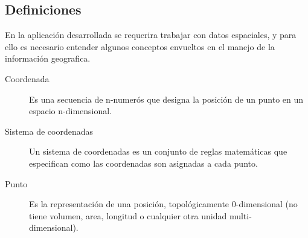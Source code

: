   \subsection{Definiciones} %
  \label{sub:definiciones}

    En la aplicaci\'on desarrollada se requerira trabajar con datos espaciales, y para ello es necesario entender algunos conceptos envueltos en el manejo de la informaci\'on geografica.

    \begin{description}
      \item[Coordenada] Es una secuencia de n-numer\'os que designa la posici\'on de un punto en un espacio n-dimensional. \\
      \item[Sistema de coordenadas] Un sistema de coordenadas es  un conjunto de reglas matemáticas que especifican como las coordenadas son asignadas  a cada  punto.
      \item[Punto] Es  la representaci\'on de una posici\'on, topol\'ogicamente 0-dimensional (no tiene volumen, area, longitud o cualquier otra unidad multi-\\dimensional).
    \end{description}





